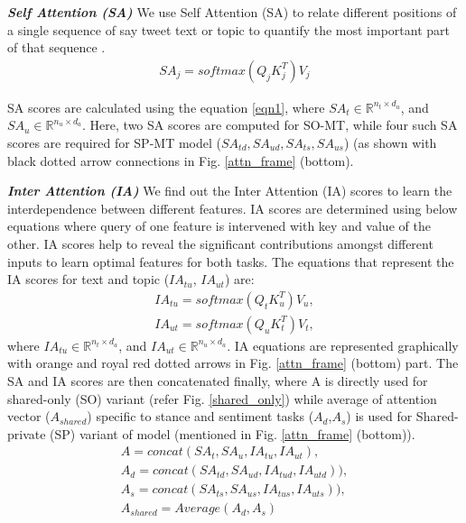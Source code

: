 \documentclass[letterpaper]{article}
\begin{document}
\par \noindent \textbf{\textit{Self Attention (SA)}} We use Self Attention (SA) to relate different positions of a single sequence of say tweet text or topic to quantify the most important part of that sequence \cite{vaswani2017attention}.  %
\begin{gather}\label{eqn1}
        SA_j = softmax(Q_{j}K^T_{j})V_{j}
\end{gather}
\par \noindent SA scores are calculated using the equation \ref{eqn1}, where $SA_t \in \mathbb{R}^{n_{t} \times d_a} $, and $SA_u \in \mathbb{R}^{n_{u} \times d_a} $. Here, two SA scores are computed for SO-MT, while four such SA scores are required for SP-MT model ($SA_{td}, SA_{ud}, SA_{ts},SA_{us}$) (as shown with black dotted arrow connections in Fig. \ref{attn_frame} (bottom).

\par \noindent \textbf{\textit{Inter Attention (IA)}} We find out the Inter Attention (IA) scores to learn the interdependence between different features. IA scores are determined using below equations where query of one feature is intervened with key and value of the other. IA scores help to reveal the significant contributions amongst different inputs to learn optimal features for both tasks. The equations that represent the IA scores for text and topic ($IA_{tu}$, $IA_{ut}$) are:
\begin{gather}
    IA_{tu} = softmax(Q_{t}K^T_{u})V_{u}, \label{ia_1} \\
    IA_{ut} = softmax(Q_{u}K^T_{t})V_{t}, \label{ia_2}
\end{gather}
where $IA_{tu} \in \mathbb{R}^{n_{t} \times d_a} $, and $IA_{ut} \in \mathbb{R}^{n_{u} \times d_a} $. IA equations are represented graphically with orange and royal red dotted arrows in Fig. \ref{attn_frame} (bottom) part. The SA and IA scores are then concatenated finally, where A is directly used for shared-only (SO) variant (refer Fig. \ref{shared_only}) while average of attention vector ($A_{shared}$) specific to stance and sentiment tasks ($A_d$,$A_s$) is used for Shared-private (SP) variant of model (mentioned in Fig. \ref{attn_frame} (bottom)).
\begin{gather}
    A    = concat(SA_{t},SA_u, IA_{tu},IA_{ut}), \\
    A_{d} = concat(SA_{td},SA_{ud}, IA_{tud},IA_{utd})), \label{attn_pol}\\
    A_{s} = concat(SA_{ts},SA_{us}, IA_{tus},IA_{uts})),\\
    A_{shared} = Average(A_{d},A_{s}) \label{attn_sh}
\end{gather}
\end{document}
